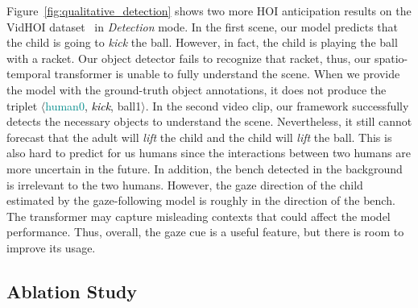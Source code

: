 \documentclass[times,twocolumn,final,authoryear]{elsarticle}
\begin{document}
Figure~\ref{fig:qualitative_detection} shows two more HOI anticipation results on the VidHOI dataset~\citep{hoi_v_set:VidHOI} in \emph{Detection} mode. In the first scene, our model predicts that the child is going to \emph{kick} the \textcolor{darkpurple}{ball}. However, in fact, the child is playing the ball with a racket. Our object detector fails to recognize that racket, thus, our spatio-temporal transformer is unable to fully understand the scene. When we provide the model with the ground-truth object annotations, it does not produce the triplet $\langle$\textcolor{darkcyan}{human0}, \textcolor{black}{\emph{kick}}, \textcolor{darkpurple}{ball1}$\rangle$. In the second video clip, our framework successfully detects the necessary objects to understand the scene. Nevertheless, it still cannot forecast that the adult will \emph{lift} the child and the child will \emph{lift} the ball. This is also hard to predict for us humans since the interactions between two humans are more uncertain in the future. In addition, the bench detected in the background is irrelevant to the two humans. However, the gaze direction of the child estimated by the gaze-following model is roughly in the direction of the bench. The transformer may capture misleading contexts that could affect the model performance. Thus, overall, the gaze cue is a useful feature, but there is room to improve its usage. 

\subsection{Ablation Study}
\end{document}
